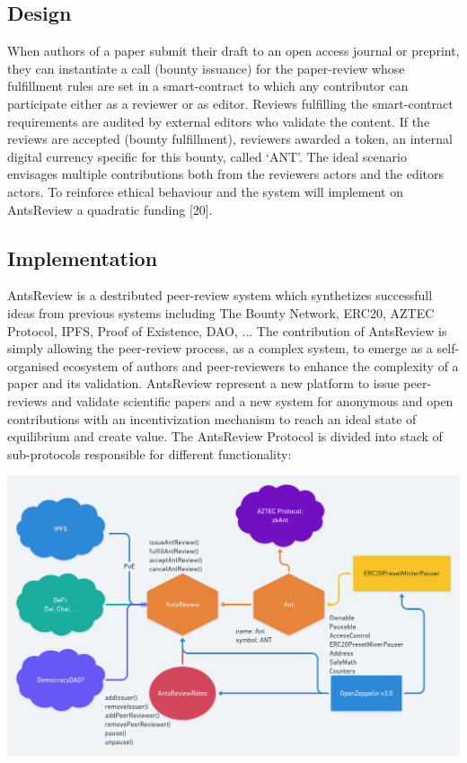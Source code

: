 \documentclass[runningheads]{llncs}
\begin{document}
\subsection{Design}
When authors of a paper submit their draft to an open access journal or preprint, they can instantiate a call (bounty issuance) for the paper-review whose fulfillment rules are set in a smart-contract to which any contributor can participate either as a reviewer or as editor. Reviews fulfilling the smart-contract requirements are audited by external editors who validate the content. If the reviews are accepted (bounty fulfillment), reviewers awarded a token, an internal digital currency specific for this bounty, called ‘ANT’. The ideal scenario envisages multiple contributions both from the reviewers actors and the editors actors. To reinforce ethical behaviour and the system will implement on AntsReview a quadratic funding [20].

\subsection{Implementation}
AntsReview is a destributed peer-review system which synthetizes successfull ideas from previous systems including The Bounty Network, ERC20, AZTEC Protocol, IPFS, Proof of Existence, DAO, ...
\newline The contribution of AntsReview is simply allowing the peer-review process, as a complex system, to emerge as a self-organised ecosystem of authors and peer-reviewers to enhance the complexity of a paper and its validation.
\newline AntsReview represent a new platform to issue peer-reviews and validate scientific papers and a new system for anonymous and open contributions with an incentivization mechanism to reach an ideal state of equilibrium and create value.
\newline The AntsReview Protocol is divided into stack of sub-protocols responsible for different functionality:

\includegraphics[scale=0.28]{Ants-Review}
\end{document}
